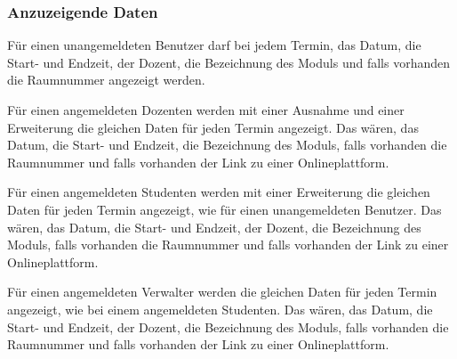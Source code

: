 \newpage

\subsubsection{Anzuzeigende Daten}
Für einen unangemeldeten Benutzer darf bei jedem Termin, das Datum, die Start- und Endzeit, der Dozent, die Bezeichnung des Moduls und falls vorhanden die Raumnummer angezeigt werden. 

\vspace{6pt}

Für einen angemeldeten Dozenten werden mit einer Ausnahme und einer Erweiterung die gleichen Daten für jeden Termin angezeigt. Das wären, das Datum, die Start- und Endzeit, die Bezeichnung des Moduls, falls vorhanden die Raumnummer und falls vorhanden der Link zu einer Onlineplattform. 

\vspace{6pt}

Für einen angemeldeten Studenten werden mit einer Erweiterung die gleichen Daten für jeden Termin angezeigt, wie für einen unangemeldeten Benutzer. Das wären, das Datum, die Start- und Endzeit, der Dozent, die Bezeichnung des Moduls, falls vorhanden die Raumnummer und falls vorhanden der Link zu einer Onlineplattform. 

\vspace{6pt}

Für einen angemeldeten Verwalter werden die gleichen Daten für jeden Termin angezeigt, wie bei einem angemeldeten Studenten. Das wären, das Datum, die Start- und Endzeit, der Dozent, die Bezeichnung des Moduls, falls vorhanden die Raumnummer und falls vorhanden der Link zu einer Onlineplattform. 

\vspace{12pt}

